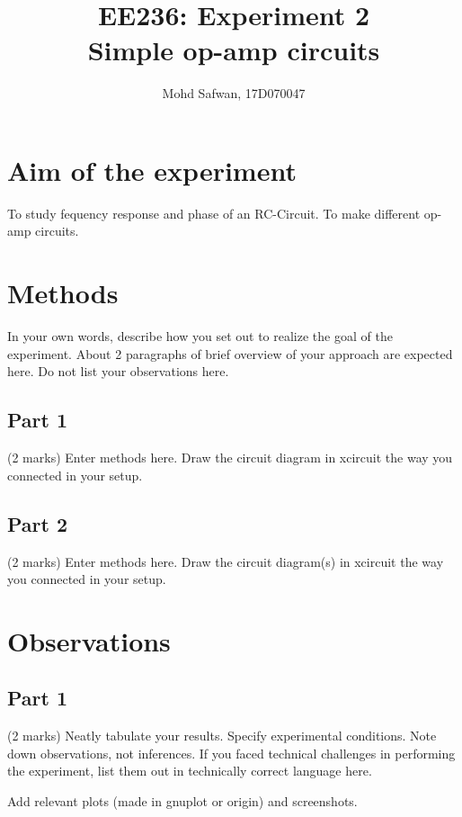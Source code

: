 \documentclass[12pt]{article}
\title{EE236: Experiment 2\\
Simple op-amp circuits}
\author{Mohd Safwan, 17D070047}
\begin{document}
\maketitle

\section{Aim of the experiment}

To study fequency response and phase of an RC-Circuit.
\newline
To make different op-amp circuits.

\section{Methods}

In your own words, describe how you set out to realize the goal of the experiment. About 2 paragraphs of brief overview of your approach are expected here. Do not list your observations here.

\subsection{Part 1}

(2 marks) Enter methods here. Draw the circuit diagram in xcircuit the way you connected in your setup.

\subsection{Part 2}

(2 marks) Enter methods here. Draw the circuit diagram(s) in xcircuit the way you connected in your setup.

\section{Observations}

\subsection{Part 1}

(2 marks) Neatly tabulate your results. Specify experimental conditions. Note down observations, not inferences. If you faced technical challenges in performing the experiment, list them out in technically correct language here.

Add relevant plots (made in gnuplot or origin) and screenshots.
\end{document}
